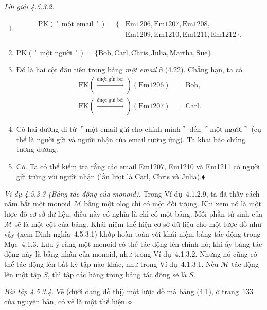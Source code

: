 \noindent\textit{Lời giải 4.5.3.2.}\keepwithnext
\begin{enumerate}[label=\alph*.]
\item
\[
\begin{aligned}
\mathrm{PK}(\ulcorner\text{một email}\urcorner)=\{&\text{Em1206},\text{Em1207},\text{Em1208},\\
&\text{Em1209},\text{Em1210},\text{Em1211},\text{Em1212}\}.
\end{aligned}
\]
\item $\mathrm{PK}(\ulcorner\text{một người}\urcorner)=\{\text{Bob},\text{Carl},\text{Chris},\text{Julia},\text{Martha},\text{Sue}\}$.
\item Đó là hai cột đầu tiên trong bảng \emph{một email} ở (4.22). Chẳng hạn, ta có
\[
\begin{aligned}
\mathrm{FK}(\xrightarrow{\text{được gửi bởi}})(\text{Em1206})&=\text{Bob},\\
\mathrm{FK}(\xrightarrow{\text{được gửi bởi}})(\text{Em1207})&=\text{Carl}.
\end{aligned}
\]
\item Có hai đường đi từ $\ulcorner\text{một email gửi cho chính mình}\urcorner$ đến $\ulcorner\text{một người}\urcorner$ (cụ thể là người gửi và người nhận của email tương ứng). Ta khai báo chúng tương đương.
\item Có. Ta có thể kiểm tra rằng các email Em1207, Em1210 và Em1211 có người gửi trùng với người nhận (lần lượt là Carl, Chris và Julia).\nobreak\hfill$\blacklozenge$
\end{enumerate}

\noindent\textit{Ví dụ 4.5.3.3 (Bảng tác động của monoid).}\keepwithnext
Trong Ví dụ~4.1.2.9, ta đã thấy cách nắm bắt một monoid $\mathcal M$ bằng một olog chỉ có một đối tượng. Khi xem nó là một lược đồ cơ sở dữ liệu, điều này có nghĩa là chỉ có một bảng. Mỗi phần tử sinh của $\mathcal M$ sẽ là một cột của bảng. Khái niệm thể hiện cơ sở dữ liệu cho một lược đồ như vậy (xem Định nghĩa~4.5.3.1) khớp hoàn toàn với khái niệm bảng tác động trong Mục~4.1.3. Lưu ý rằng một monoid có thể tác động lên chính nó; khi ấy bảng tác động này là bảng nhân của monoid, như trong Ví dụ~4.1.3.2. Nhưng nó cũng có thể tác động lên bất kỳ tập nào khác, như trong Ví dụ~4.1.3.1. Nếu $\mathcal M$ tác động lên một tập $S$, thì tập các hàng trong bảng tác động sẽ là $S$.

\noindent\textit{Bài tập 4.5.3.4.}\keepwithnext
Vẽ (dưới dạng đồ thị) một lược đồ mà bảng (4.1), ở trang~133 của nguyên bản, có vẻ là một thể hiện.\nobreak\hfill$\diamond$

